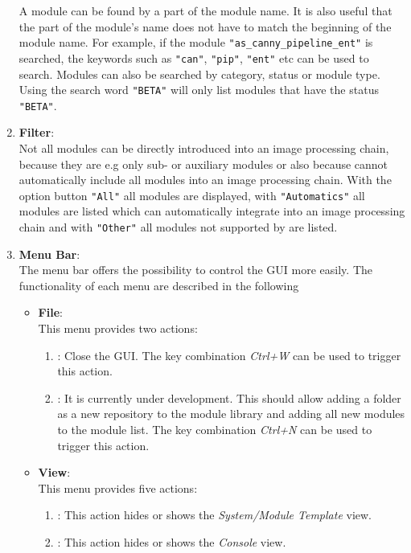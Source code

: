 \begin{enumerate}
		A module can be found by a part of the module name.  It is also useful that the part of the module's name does not have to match the beginning of the module name. For example, if the module \texttt{"as\_canny\_pipeline\_ent"} is searched, the keywords such as \texttt{"can"}, \texttt{"pip"}, \texttt{"ent"} etc can be used to search. Modules can also be searched by category, status or module type. Using the search word \texttt{"BETA"} will only list modules that have the status \texttt{"BETA"}.
		\item \textbf{Filter}:\\
		Not all \asterics modules can be directly introduced into an image processing chain, because they are e.g only sub- or auxiliary modules or also because \automatics cannot automatically include all modules into an image processing chain. With the option button \texttt{"All"} all \asterics modules are displayed, with \texttt{"Automatics"} all modules are listed which \automatics can automatically integrate into an image processing chain and with \texttt{"Other"} all modules not supported by \automatics are listed.
		\item \textbf{Menu Bar}:\\
			The menu bar offers the possibility to control the GUI more easily. The functionality of each menu are described in the following
			\begin{itemize}
				\item \textbf{File}:\\This menu provides two actions:
					\begin{enumerate}
						\item {}: Close the GUI. The key combination \textit{Ctrl+W} can be used to trigger this action.
						\item {}: It is currently under development. This should allow adding a folder as a new repository to the module library and adding all new modules to the module list. The key combination \textit{Ctrl+N} can be used to trigger this action.
					\end{enumerate}
				\item \textbf{View}: \\This menu provides five actions:
					\begin{enumerate}
						\item {}: This action hides or shows the \textit{System/Module Template} view.
						\item {}: This action hides or shows the \textit{Console} view.

\end{enumerate}
\end{itemize}
\end{enumerate}
